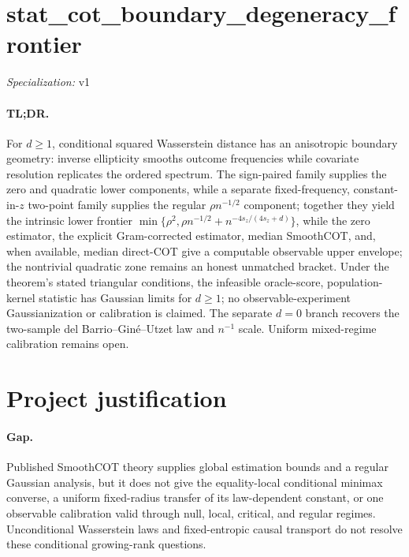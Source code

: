 \documentclass{article}
\begin{document}
\sloppy

\section*{stat\_\allowbreak{}cot\_\allowbreak{}boundary\_\allowbreak{}degeneracy\_\allowbreak{}frontier}

\noindent\textit{Specialization:} v1\par

\paragraph{TL;DR.} For \(d\ge1\), conditional squared Wasserstein distance has an anisotropic boundary geometry: inverse ellipticity smooths outcome frequencies while covariate resolution replicates the ordered spectrum. The sign-paired family supplies the zero and quadratic lower components, while a separate fixed-frequency, constant-in-\(z\) two-point family supplies the regular \(\rho n^{-1/2}\) component; together they yield the intrinsic lower frontier \(\min\{\rho^2,\rho n^{-1/2}+n^{-4s_z/(4s_z+d)}\}\), while the zero estimator, the explicit Gram-corrected estimator, median SmoothCOT, and, when available, median direct-COT give a computable observable upper envelope; the nontrivial quadratic zone remains an honest unmatched bracket. Under the theorem's stated triangular conditions, the infeasible oracle-score, population-kernel statistic has Gaussian limits for \(d\ge1\); no observable-experiment Gaussianization or calibration is claimed. The separate \(d=0\) branch recovers the two-sample del Barrio--Gin\'e--Utzet law and \(n^{-1}\) scale. Uniform mixed-regime calibration remains open.

\section{Project justification}

\paragraph{Gap.} Published SmoothCOT theory supplies global estimation bounds and a regular Gaussian analysis, but it does not give the equality-local conditional minimax converse, a uniform fixed-radius transfer of its law-dependent constant, or one observable calibration valid through null, local, critical, and regular regimes. Unconditional Wasserstein laws and fixed-entropic causal transport do not resolve these conditional growing-rank questions.
\end{document}
